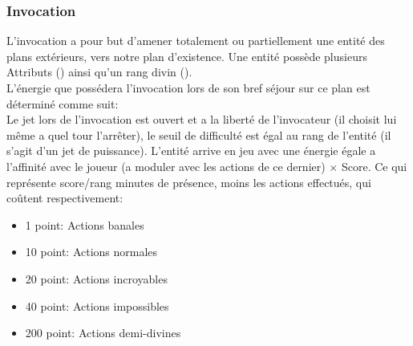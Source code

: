 \subsubsection{Invocation}
L'invocation a pour but d'amener totalement ou partiellement une entité des plans extérieurs, vers notre plan d'existence.
Une entité possède plusieurs Attributs () ainsi qu'un rang divin ().\\
L'énergie que possédera l'invocation lors de son bref séjour sur ce plan est déterminé comme suit:\\
Le jet lors de l'invocation est ouvert et a la liberté de l'invocateur 
(il choisit lui même a quel tour l'arrêter), le seuil de difficulté est égal au rang de l'entité (il s’agit d’un jet de puissance).
L'entité arrive en jeu avec une énergie égale a l'affinité avec le joueur (a moduler avec les actions de ce dernier) $\times$ Score.
Ce qui représente score/rang minutes de présence, moins les actions effectués, qui coûtent respectivement:
\begin{itemize}
    \item 1 point: Actions banales
    \item 10 point: Actions normales
    \item 20 point: Actions incroyables
    \item 40 point: Actions impossibles
    \item 200 point: Actions demi-divines
\end{itemize}
